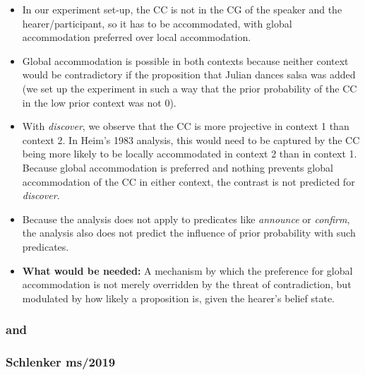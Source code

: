 \documentclass[11pt,fleqn]{article}
\newcommand{\6}{\mbox{$[\hspace*{-.6mm}[$}}
\newcommand{\9}{\mbox{$]\hspace*{-.6mm}]$}}
\begin{document}
\begin{itemize}

\item In our experiment set-up, the CC is not in the CG of the speaker and the hearer/participant, so it has to be accommodated, with global accommodation preferred over local accommodation.

\item Global accommodation is possible in both contexts because neither context would be contradictory if the proposition that Julian dances salsa was added (we set up the experiment in such a way that the prior probability of the CC in the low prior context was not 0).

\item With {\em discover}, we observe that the CC is more projective in context 1 than context 2. In Heim's 1983 analysis, this would need to be captured by the CC being more likely to be locally accommodated in context 2 than in context 1. Because global accommodation is preferred and nothing prevents global accommodation of the CC in either context, the contrast is not predicted for {\em discover}.

\item Because the analysis does not apply to predicates like {\em announce} or {\em confirm}, the analysis also does not predict the influence of prior probability with such predicates.

\item {\bf What would be needed:} A mechanism by which the preference for global accommodation is not merely overridden by the threat of contradiction, but modulated by how likely a proposition is, given the hearer's belief state.

\end{itemize}

\subsubsection{\citealt{abrusan2011,abrusan2016} and \citealt{best-question}}

\subsubsection{\citealt{abusch02,abusch10,romoli2015}}

\subsubsection{Schlenker ms/2019}
\end{document}
